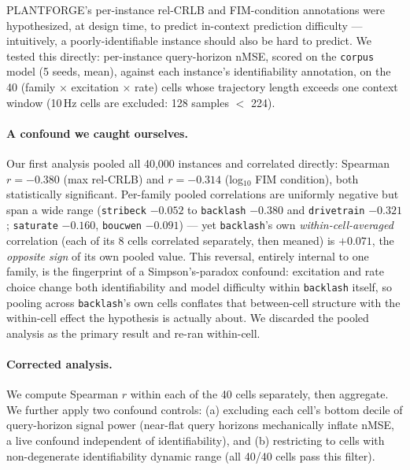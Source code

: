 \documentclass{article}
\begin{document}
PLANTFORGE's per-instance rel-CRLB and FIM-condition annotations were
hypothesized, at design time, to predict in-context prediction difficulty ---
intuitively, a poorly-identifiable instance should also be hard to predict. We
tested this directly: per-instance query-horizon nMSE, scored on the
\texttt{corpus} model (5 seeds, mean), against each instance's identifiability
annotation, on the 40 (family $\times$ excitation $\times$ rate) cells whose
trajectory length exceeds one context window (10\,Hz cells are excluded: 128
samples $<$ 224).

\paragraph{A confound we caught ourselves.} Our first analysis pooled all
40,000 instances and correlated directly: Spearman $r=-0.380$ (max rel-CRLB) and
$r=-0.314$ (log$_{10}$ FIM condition), both statistically significant. Per-family
pooled correlations are uniformly negative but span a wide range
(\texttt{stribeck} $-0.052$ to \texttt{backlash} $-0.380$ and
\texttt{drivetrain} $-0.321$; \texttt{saturate} $-0.160$, \texttt{boucwen}
$-0.091$) --- yet \texttt{backlash}'s own \emph{within-cell-averaged}
correlation (each of its 8 cells correlated separately, then meaned) is
$+0.071$, the \emph{opposite sign} of its own pooled value. This reversal,
entirely internal to one family, is the fingerprint of a Simpson's-paradox
confound: excitation and rate choice change both identifiability and model
difficulty within \texttt{backlash} itself, so pooling across
\texttt{backlash}'s own cells conflates that between-cell structure with the
within-cell effect the hypothesis is actually about. We discarded the pooled
analysis as the primary result and re-ran within-cell.

\paragraph{Corrected analysis.} We compute Spearman $r$ within each of the 40
cells separately, then aggregate. We further apply two confound controls: (a)
excluding each cell's bottom decile of query-horizon signal power (near-flat
query horizons mechanically inflate nMSE, a live confound independent of
identifiability), and (b) restricting to cells with non-degenerate
identifiability dynamic range (all 40/40 cells pass this filter).
\end{document}
